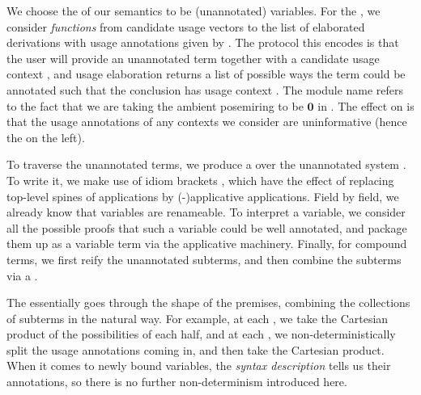 
We choose the \AgdaBound{$\V$} of our semantics to be (unannotated) variables.
For the \AgdaBound{$\C$}, we consider \emph{functions} from candidate usage
vectors  to the list of elaborated derivations with usage
annotations given by .
The protocol this encodes is that the user will provide an unannotated term
together with a candidate usage context , and usage elaboration
returns a list of possible ways the term could be annotated such that the
conclusion has usage context .
The module name  refers to the fact that we are taking the
ambient posemiring to be $\mathbf0$ in .
The effect on  is that the usage annotations of any
contexts we consider are uninformative (hence the \AgdaSymbol{\_} on the left).


To traverse the unannotated terms, we produce a  over the
unannotated system \AgdaSpace{}.
To write it, we make use of idiom brackets
\AgdaSymbol{\ensuremath{\llparenthesis}}\AgdaSpace{}\AgdaSymbol{$\ldots$}\AgdaSpace{}\AgdaSymbol{\ensuremath{\rrparenthesis}},
which have the effect of replacing top-level spines of applications by
(-)applicative applications.
Field by field, we already know that variables are renameable.
To interpret a variable, we consider all the possible proofs that such a
variable could be well annotated, and package them up as a variable term via
the applicative machinery.
Finally, for compound terms, we first reify the unannotated subterms, and then
combine the subterms via a .


The  essentially goes through the shape of the premises,
combining the collections of subterms in the natural way.
For example, at each
\AgdaInductiveConstructor{\AgdaUnderscore{}$\dottimes$\AgdaUnderscore{}},
we take the Cartesian product of the possibilities of each half, and at each
\AgdaInductiveConstructor{\AgdaUnderscore{}$\sep$\AgdaUnderscore{}},
we non-deterministically split the usage annotations coming in, and then take
the Cartesian product.
When it comes to newly bound variables, the \emph{syntax description} tells us
their annotations, so there is no further non-determinism introduced here.

